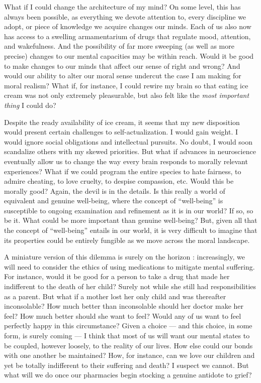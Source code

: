 \documentclass[a4paper,14pt]{extarticle}
\begin{document}
What if I could change the architecture of my mind?
On some level, this has always been possible, as everything we devote attention to, every discipline we adopt, or piece of knowledge we acquire changes our minds.
Each of us also now has access to a swelling armamentarium of drugs that regulate mood, attention, and wakefulness.
And the possibility of far more sweeping (as well as more precise) changes to our mental capacities may be within reach.
Would it be good to make changes to our minds that affect our sense of right and wrong?
And would our ability to alter our moral sense undercut the case I am making for moral realism?
What if, for instance, I could rewire my brain so that eating ice cream was not only extremely pleasurable, but also felt like the \textit{most important thing} I could do?

Despite the ready availability of ice cream, it seems that my new disposition would present certain challenges to self-actualization.
I would gain weight.
I would ignore social obligations and intellectual pursuits.
No doubt, I would soon scandalize others with my skewed priorities.
But what if advances in neuroscience eventually allow us to change the way every brain responds to morally relevant experiences?
What if we could program the entire species to hate fairness, to admire cheating, to love cruelty, to despise compassion, etc.
Would this be morally good?
Again, the devil is in the details.
Is this really a world of equivalent and genuine well-being, where the concept of ``well-being'' is susceptible to ongoing examination and refinement as it is in our world?
If so, so be it.
What could be more important than genuine well-being?
But, given all that the concept of ``well-being'' entails in our world, it is very difficult to imagine that its properties could be entirely fungible as we move across the moral landscape.

A miniature version of this dilemma is surely on the horizon :
increasingly, we will need to consider the ethics of using medications to mitigate mental suffering.
For instance, would it be good for a person to take a drug that made her indifferent to the death of her child?
Surely not while she still had responsibilities as a parent.
But what if a mother lost her only child and was thereafter inconsolable?
How much better than inconsolable should her doctor make her feel?
How much better should she want to feel?
Would any of us want to feel perfectly happy in this circumstance?
Given a choice --- and this choice, in some form, is surely coming --- I think that most of us will want our mental states to be coupled, however loosely, to the reality of our lives.
How else could our bonds with one another be maintained?
How, for instance, can we love our children and yet be totally indifferent to their suffering and death?
I suspect we cannot.
But what will we do once our pharmacies begin stocking a genuine antidote to grief?
\end{document}
